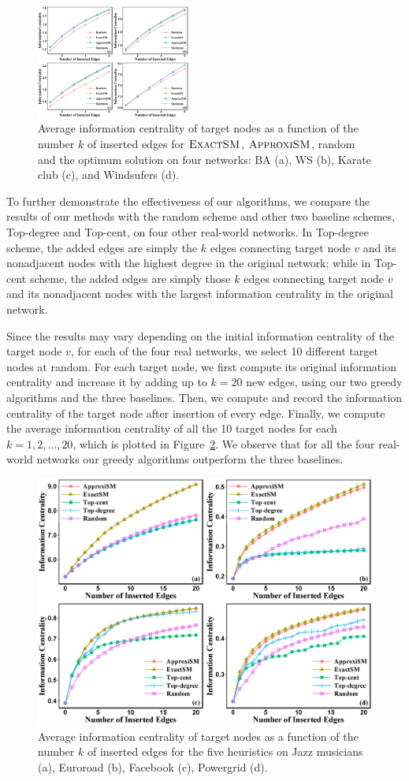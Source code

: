 \documentclass{article}
\newcommand{\ExactSM}{\textsc{ExactSM}}
\newcommand{\ApproxiSM}{\textsc{ApproxiSM}}
\begin{document}
\begin{figure}
\centering
\includegraphics[width=0.45\textwidth]{opt}
\caption{Average information centrality of target nodes as a function of the number $k$ of inserted edges for $\ExactSM$, $\ApproxiSM$, random and the optimum solution on four networks: BA  (a), WS  (b), Karate club (c),  and Windsufers (d).\label{ComOpt}}
\end{figure}

To further demonstrate the effectiveness of our algorithms, we  compare the results of our methods with the random scheme and other two baseline schemes, Top-degree and Top-cent, on four other real-world networks. In Top-degree scheme, the added edges are simply the  $k$ edges  connecting target node $v$  and its nonadjacent nodes with the highest degree in the original network; while in Top-cent scheme, the added edges are simply those  $k$ edges  connecting target node $v$ and its nonadjacent  nodes with the largest information centrality  in the original network.


Since the results may vary depending on the initial information centrality of the target node $v$, for each of the four real networks, we select 10 different target nodes at random.  For each target node, we first compute its original information centrality and  increase
it  by adding up to $k = 20$ new edges, using our two greedy algorithms and the three baselines. Then, we compute and record the information centrality of the target node after insertion of every edge. Finally, we compute the average  information centrality of all the 10 target nodes for each   $k =1,2,\ldots, 20$, which is plotted in  Figure~\ref{ComBase}.  We  observe that for all the four real-world networks  our greedy algorithms outperform the three baselines.

\begin{figure}
\centering
\includegraphics[width=.45\textwidth]{compare}
\caption{Average information centrality of target nodes as a function of the number $k$ of inserted edges for the five heuristics on Jazz musicians (a), Euroroad (b), Facebook (c), Powergrid (d).\label{ComBase} }
\end{figure}
\end{document}
